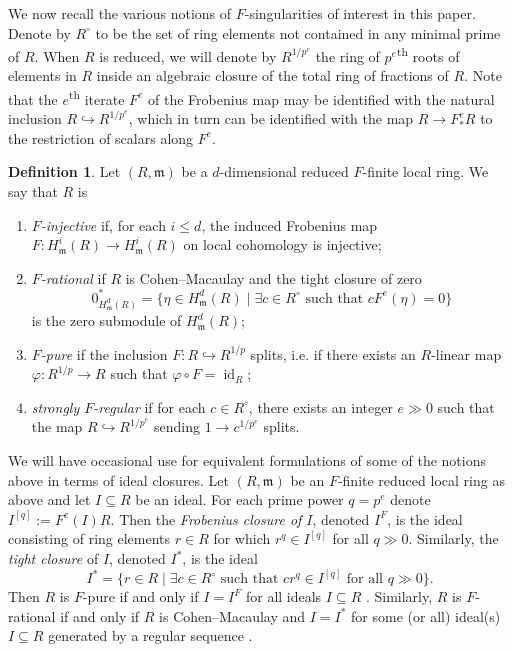 \documentclass[reqno,11pt]{amsart}
\numberwithin{equation}{section}
\theoremstyle{definition}
\theoremstyle{definition}
\theoremstyle{definition}
\newtheorem{definition}[theorem]{Definition}
\theoremstyle{remark}
\newcommand{\ts}{\textsuperscript}
\newcommand{\id}{\operatorname{id}}
\newcommand{\fm}{\mathfrak{m}}
\begin{document}
We now recall the various notions of $F$-singularities of interest in this paper. Denote by $R^\circ$ to be the set of ring elements not contained in any minimal prime of $R$. When $R$ is reduced, we will denote by $R^{1/p^e}$ the ring of $p^e$\ts{th} roots of elements in $R$ inside an algebraic closure of the total ring of fractions of $R$. Note that the $e$\ts{th} iterate $F^e$ of the Frobenius map may be identified with the natural inclusion $R \hookrightarrow R^{1/p^e}$, which in turn can be identified with the map $R\to F^e_* R$ to the restriction of scalars along $F^e$.
\begin{definition}
    Let $(R,\fm)$ be a $d$-dimensional reduced $F$-finite local ring. We say that $R$ is
\begin{enumerate}[label=(\alph*)]
    \item \emph{$F$-injective} if, for each $i\leq d$, the induced Frobenius map $F\colon H^i_\fm(R)\to H^i_\fm(R)$ on local cohomology is injective;
    \item \emph{$F$-rational} if $R$ is Cohen--Macaulay and the tight closure of zero
    \[
    0^*_{H^d_\fm(R)} = \{\eta \in H^d_\fm(R) \mid \exists c \in R^\circ \text{ such that } cF^e(\eta) = 0\}
    \]
    is the zero submodule of $H^d_\fm(R)$;
    \item \emph{$F$-pure} if the inclusion $F\colon R\hookrightarrow R^{1/p}$ splits, i.e. if there exists an $R$-linear map $\varphi\colon R^{1/p}\to R$ such that $\varphi\circ F = \id_R$;
    \item \emph{strongly $F$-regular} if for each $c\in R^\circ$, there exists an integer $e\gg 0$ such that the map $R\hookrightarrow R^{1/p^e}$ sending $1\to c^{1/p^e}$ splits.
\end{enumerate}
\end{definition}

We will have occasional use for equivalent formulations of some of the notions above in terms of ideal closures. Let $(R,\fm)$ be an $F$-finite reduced local ring as above and let $I\subseteq R$ be an ideal. For each prime power $q=p^e$ denote $I^{[q]}:=F^e(I)R$. Then the \emph{Frobenius closure of $I$}, denoted $I^F$, is the ideal consisting of ring elements $r\in R$ for which $r^q\in I^{[q]}$ for all $q\gg 0$. Similarly, the \emph{tight closure} of $I$, denoted $I^*$, is the ideal
$$I^* = \{r\in R\mid \exists c\in R^\circ\text{ such that } cr^{q}\in I^{[q]}\text{ for all } q\gg 0\}.$$ Then $R$ is $F$-pure if and only if $I=I^F$ for all ideals $I\subseteq R$ \cite{Hoc77}. Similarly, $R$ is $F$-rational if and only if $R$ is Cohen--Macaulay and $I = I^*$ for some (or all) ideal(s) $I\subseteq R$ generated by a regular sequence \cite{HH94a}.
\end{document}
